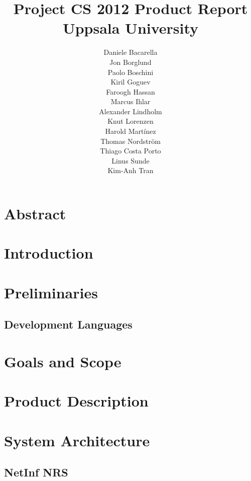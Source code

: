 \documentclass[11pt]{report}
\title{Project CS 2012 Product Report\\Uppsala University\\}
\author{Daniele Bacarella\\
		Jon Borglund\\
		Paolo Boschini\\
		Kiril Goguev\\
		Faroogh Hassan\\
		Marcus Ihlar\\
		Alexander Lindholm\\
		Knut Lorenzen\\
		Harold Mart\'{i}nez\\
		Thomas Nordstr\"om\\
		Thiago Costa Porto\\
		Linus Sunde\\
		Kim-Anh Tran
}
\date{}
\begin{document}
\maketitle

\tableofcontents

\chapter{Abstract}

\chapter{Introduction}


\chapter{Preliminaries}

\section{Development Languages}


\chapter{Goals and Scope}



\chapter{Product Description}





\chapter{System Architecture}



\section {NetInf NRS}


\end{document}
